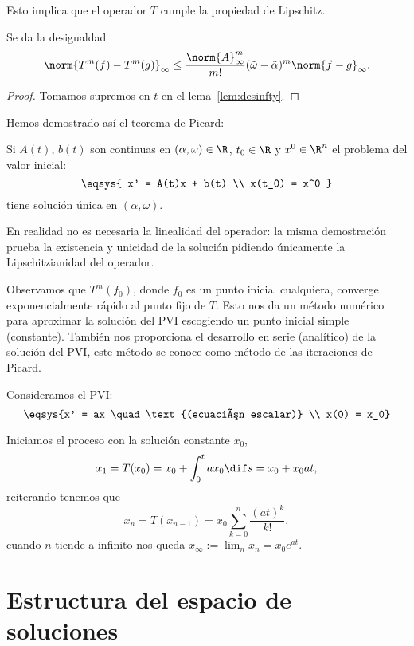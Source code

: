 \documentclass[../main.tex]{subfiles}
\begin{document}
Esto implica que el operador \(T\) cumple la propiedad de Lipschitz.

\begin{corollary}
	Se da la desigualdad
	\[\norm{T^m(f) - T^m(g)}_\infty \leq 
		\frac{\norm{A}^m_\infty}{m!} (\tilde{\omega} - \tilde{\alpha})^m
		\norm{f - g}_\infty.\]
\end{corollary}

\begin{proof}
	Tomamos supremos en \(t\) en el lema~\ref{lem:desinfty}.
\end{proof}

Hemos demostrado así el teorema de Picard:

\begin{theorem}[Picard]
	Si \(A(t)\), \(b(t)\) son continuas en \((\alpha, \omega) \in \R\), 
	\(t_0 \in \R\) y \(x^0 \in \R^n\) el problema del valor inicial:
	\[\eqsys{
		x' = A(t)x + b(t) \\
		x(t_0) = x^0
		}\]
	tiene solución única en \((\alpha, \omega)\).
\end{theorem}

\begin{remark}
  En realidad no es necesaria la linealidad del operador: la misma demostración
  prueba la existencia y unicidad de la solución pidiendo únicamente
  la Lipschitzianidad del operador.
\end{remark}

Observamos que \(T^m(f_0)\), donde \(f_0\) es un punto inicial cualquiera,
converge exponencialmente rápido al punto fijo de \(T\). Esto nos da un método
numérico para aproximar la solución del PVI escogiendo un punto inicial simple
(constante). También nos proporciona el desarrollo en serie (analítico) de la
solución del PVI, este método se conoce como método de las iteraciones de
Picard.

\begin{example}
	Consideramos el PVI:
	\[\eqsys{x' = ax \quad \text{(ecuación escalar)} \\
		x(0) = x_0}\]

	Iniciamos el proceso con la solución constante \(x_0\), 
	\[x_1 = T(x_0) = x_0 + \int_0^t a x_0 \dif s = x_0 + x_0 a t,\]
	reiterando tenemos que
	\[x_n = T(x_{n - 1}) = x_0 \sum_{k = 0}^n \frac{(at)^k}{k!},\] cuando \(n\)
    tiende a infinito nos queda \(x_\infty := \lim_n x_n = x_0 e^{at}\).
\end{example}

\section{Estructura del espacio de soluciones}
\end{document}
